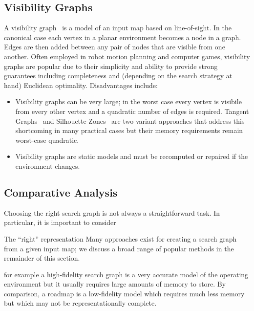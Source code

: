 \subsection{Visibility Graphs}
\label{cha::lit::graphs::vis}
A visibility graph~\citep{lozanoperez79} is a model of an input map based on
line-of-sight.  In the canonical case each vertex in a planar environment
becomes a node in a graph. Edges are then added between any pair of nodes that
are visible from one another.  Often employed in robot
motion planning and computer games, visibility graphs are popular due to their 
simplicity and ability to provide strong guarantees including completeness and 
(depending on the search strategy at hand) Euclidean optimality. Disadvantages 
include:
\begin{itemize}
\item Visibility graphs can be very large; in the worst case every
vertex is visibile from every other vertex and a quadratic number
of edges is required. Tangent Graphs~\citep{liu92} and Silhouette Zones~\citep{young01b}
are two variant approaches that address this shortcoming in many practical
cases but their memory requirements remain worst-case quadratic.
\item Visibility graphs are static models and must be recomputed or 
repaired if the environment changes.
\end{itemize}

\subsection{Comparative Analysis}
\label{cha::lit::graphs::analysis}
Choosing the right search graph is not always a straightforward task.
In particular, it is important to consider 


%
%


The ``right'' representation 
Many approaches exist for creating a search graph from a given input map; we
discuss a broad range of popular methods in the remainder of this section.
\\ \newline


 for example a high-fidelity search graph
is a very accurate model of the operating environment but it usually
requires large amounts of memory to store. 
By comparison, a roadmap is a low-fidelity model which requires
much less memory but which may not be representationally complete.

